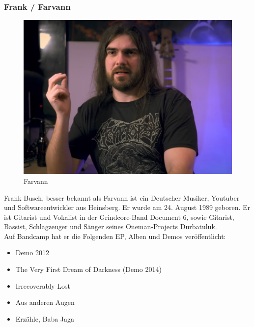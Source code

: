 \documentclass[twocolumn,10pt]{article}
\begin{document}
			\subsubsection{Frank / Farvann}
			\begin{figure}
				\includegraphics[width=\linewidth]{farvann.jpg}
				\caption{Farvann \cite{farvannImg}}
			\end{figure}
			Frank Busch, besser bekannt als Farvann\cite{farvann2023} ist ein Deutscher Musiker\cite{durbatulukbandcamp}, Youtuber\cite{youtubefarvann} und Softwareentwickler aus Heinsberg. Er wurde am 24. August 1989 geboren. Er ist Gitarist und Vokalist in der Grindcore-Band Document 6, sowie Gitarist, Bassist, Schlagzeuger und Sänger seines Oneman-Projects Durbatuluk.\\
			Auf Bandcamp\cite{durbatulukbandcamp} hat er die Folgenden EP, Alben und Demos veröffentlicht:
			\begin{itemize}
				\item Demo 2012
				\item The Very First Dream of Darkness (Demo 2014)
				\item Irrecoverably Lost
				\item Aus anderen Augen
				\item Erzähle, Baba Jaga
			\end{itemize}
		
			\pagebreak
\end{document}
